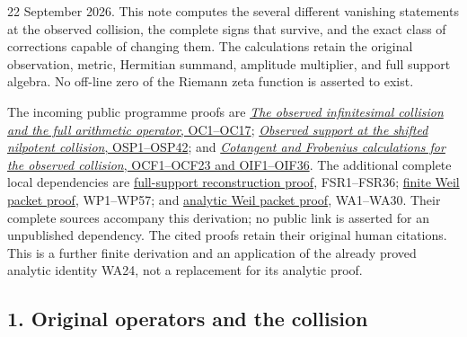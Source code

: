 \documentclass[
  10pt,
  a4paper,
]{article}
\begin{document}
22 September 2026. This note computes the several different vanishing
statements at the observed collision, the complete signs that survive,
and the exact class of corrections capable of changing them. The
calculations retain the original observation, metric, Hermitian summand,
amplitude multiplier, and full support algebra. No off-line zero of the
Riemann zeta function is asserted to exist.

The incoming public programme proofs are
\href{https://github.com/KokunoYumeto/zeta-function-research-reader/blob/c9df443d9e1df000dfbb083943f97197e746eb08/workbenches/splitzero-tandem/branches/identity-absorber-square/OBSERVED_COLLISION.md}{\emph{The
observed infinitesimal collision and the full arithmetic operator},
OC1--OC17};
\href{https://github.com/KokunoYumeto/zeta-function-research-reader/blob/c9df443d9e1df000dfbb083943f97197e746eb08/workbenches/splitzero-tandem/branches/identity-absorber-square/OBSERVED_SUPPORT_PROPAGATION.md}{\emph{Observed
support at the shifted nilpotent collision}, OSP1--OSP42}; and
\href{https://github.com/KokunoYumeto/zeta-function-research-reader/blob/c9df443d9e1df000dfbb083943f97197e746eb08/workbenches/splitzero-tandem/branches/identity-absorber-square/OBSERVED_COTANGENT_FROBENIUS.md}{\emph{Cotangent
and Frobenius calculations for the observed collision}, OCF1--OCF23 and
OIF1--OIF36}. The additional complete local dependencies are
\href{https://github.com/KokunoYumeto/zeta-function-research-reader/blob/173dbc6ed5a03235dbe7654f928f3692107db39b/workbenches/splitzero-tandem/branches/tau-zero-prime-positivity/FULL_SUPPORT_RECONSTRUCTION_DERIVATION.md}{full-support
reconstruction proof}, FSR1--FSR36;
\href{https://github.com/KokunoYumeto/zeta-function-research-reader/blob/173dbc6ed5a03235dbe7654f928f3692107db39b/workbenches/splitzero-tandem/branches/tau-zero-prime-positivity/WEIL_PACKET_DERIVATION.md}{finite
Weil packet proof}, WP1--WP57; and
\href{https://github.com/KokunoYumeto/zeta-function-research-reader/blob/173dbc6ed5a03235dbe7654f928f3692107db39b/workbenches/splitzero-tandem/branches/tau-zero-prime-positivity/WEIL_PACKET_ANALYTIC_DERIVATION.md}{analytic
Weil packet proof}, WA1--WA30. Their complete sources accompany this
derivation; no public link is asserted for an unpublished dependency.
The cited proofs retain their original human citations. This is a
further finite derivation and an application of the already proved
analytic identity WA24, not a replacement for its analytic proof.

\subsection{1. Original operators and the
collision}\label{original-operators-and-the-collision}
\end{document}
